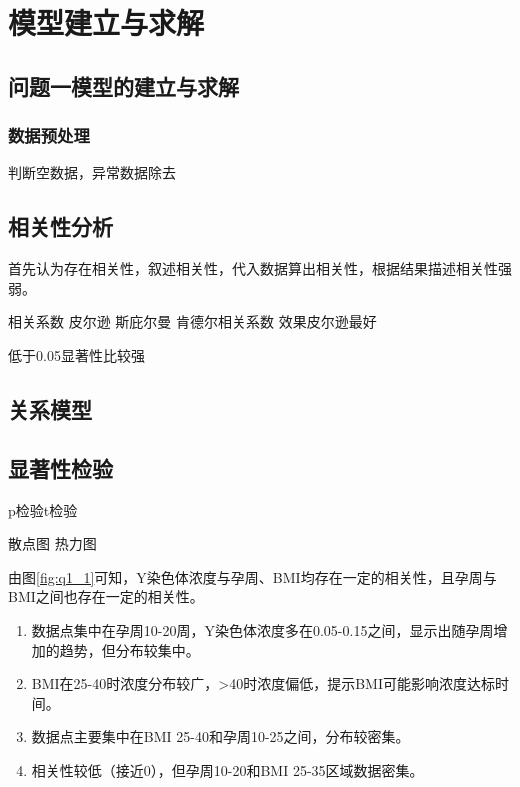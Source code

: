 \documentclass[withoutpreface,bwprint]{cumcmthesis} %
\begin{document}
\section{模型建立与求解}

\subsection{问题一模型的建立与求解}
\subsubsection{数据预处理}
判断空数据，异常数据除去

\subsection{相关性分析}
首先认为存在相关性，叙述相关性，代入数据算出相关性，根据结果描述相关性强弱。

相关系数 皮尔逊 斯庇尔曼 肯德尔相关系数 效果皮尔逊最好 

低于0.05显著性比较强
\subsection{关系模型}

\subsection{显著性检验}

p检验t检验

散点图 热力图







由图\ref{fig:q1_1}可知，Y染色体浓度与孕周、BMI均存在一定的相关性，且孕周与BMI之间也存在一定的相关性。

\begin{enumerate}
    \item 数据点集中在孕周10-20周，Y染色体浓度多在0.05-0.15之间，显示出随孕周增加的趋势，但分布较集中。
    \item BMI在25-40时浓度分布较广，>40时浓度偏低，提示BMI可能影响浓度达标时间。
    \item 数据点主要集中在BMI 25-40和孕周10-25之间，分布较密集。
    \item 相关性较低（接近0），但孕周10-20和BMI 25-35区域数据密集。
\end{enumerate}
\end{document}
